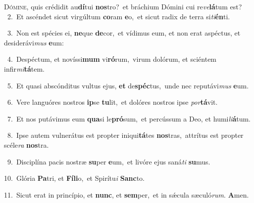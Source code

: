\lettrine{\initial\textcolor{\initialcolor}{D}}{ómine,} quis crédidit au\-\textbf{dí}\-tui \textbf{nos}\-tro?~\star et bráchium Dómini cui re\-\textit{ve}\-\textbf{lá}tum est?\\
{\numbfont\textcolor{\numbcolor}{~2.}}~Et ascéndet sicut virgúltum \textbf{co}\-ram \textbf{e}\-o,~\star et sicut radix de terra si\-\textit{ti}\-\textbf{én}ti.\par
{\numbfont\textcolor{\numbcolor}{~3.}}~Non est spécies ei, \textbf{ne}\-que \textbf{de}\-cor,~\star et vídimus eum, et non erat aspéctus, et desiderávi\textit{mus} \textbf{e}\-um:\par
{\numbfont\textcolor{\numbcolor}{~4.}}~Despéctum, et novíssi\textbf{mum} vi\-\textbf{ró}\-rum,~\star virum dolórum, et sciéntem infir\-\textit{mi}\-\textbf{tá}tem.\par
{\numbfont\textcolor{\numbcolor}{~5.}}~Et quasi abscónditus vultus ejus, \textbf{et} de\-\textbf{spéc}\-tus,~\star unde nec reputávi\textit{mus} \textbf{e}\-um.\par
{\numbfont\textcolor{\numbcolor}{~6.}}~Vere languóres nostros \textbf{ip}\-se \textbf{tu}\-lit,~\star et dolóres nostros ipse \textit{por}\-\textbf{tá}vit.\par
{\numbfont\textcolor{\numbcolor}{~7.}}~Et nos putávimus eum \textbf{qua}\-si le\-\textbf{pró}\-sum,~\star et percússum a Deo, et humi\-\textit{li}\-\textbf{á}tum.\par
{\numbfont\textcolor{\numbcolor}{~8.}}~Ipse autem vulnerátus est propter iniqui\-\textbf{tá}\-tes \textbf{nos}\-tras,~\star attrítus est propter scéle\textit{ra} \textbf{nos}\-tra.\par
{\numbfont\textcolor{\numbcolor}{~9.}}~Disciplína pacis nostræ \textbf{su}\-per \textbf{e}\-um,~\star et livóre ejus saná\textit{ti} \textbf{su}\-mus.\par
{\numbfont\textcolor{\numbcolor}{10.}}~Glória \textbf{Pa}\-tri, et \textbf{Fí}\-\textbf{li}o,~\star et Spirítu\textit{i} \textbf{Sanc}\-to.\par
{\numbfont\textcolor{\numbcolor}{11.}}~Sicut erat in princípio, et \textbf{nunc}\-, et \textbf{sem}\-per,~\star et in sǽcula sæculó\-\textit{rum}\-. \textbf{A}\-men.\par
